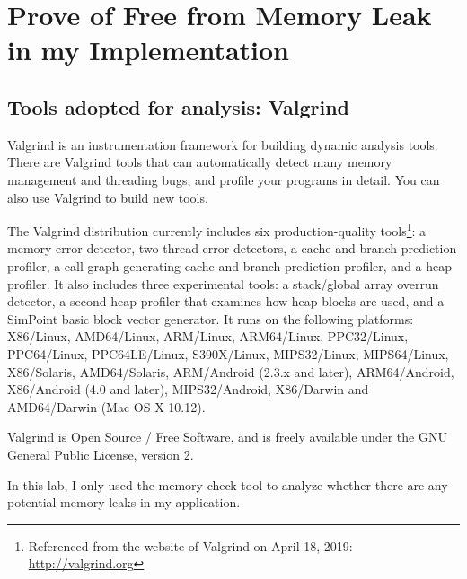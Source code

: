 \documentclass[a4paper]{report}
\begin{document}
\section{Prove of Free from Memory Leak in my Implementation}
\subsection{Tools adopted for analysis: Valgrind}
Valgrind is an instrumentation framework for building dynamic analysis tools. There are Valgrind tools that can automatically detect many memory management and threading bugs, and profile your programs in detail. You can also use Valgrind to build new tools. 
\par
The Valgrind distribution currently includes six production-quality tools\footnote{Referenced from the website of Valgrind on April 18, 2019: \url{http://valgrind.org}}: a memory error detector, two thread error detectors, a cache and branch-prediction profiler, a call-graph generating cache and branch-prediction profiler, and a heap profiler. It also includes three experimental tools: a stack/global array overrun detector, a second heap profiler that examines how heap blocks are used, and a SimPoint basic block vector generator. It runs on the following platforms: X86/Linux, AMD64/Linux, ARM/Linux, ARM64/Linux, PPC32/Linux, PPC64/Linux, PPC64LE/Linux, S390X/Linux, MIPS32/Linux, MIPS64/Linux, X86/Solaris, AMD64/Solaris, ARM/Android (2.3.x and later), ARM64/Android, X86/Android (4.0 and later), MIPS32/Android, X86/Darwin and AMD64/Darwin (Mac OS X 10.12).
\par
Valgrind is Open Source / Free Software, and is freely available under the GNU General Public License, version 2.
\par
In this lab, I only used the memory check tool to analyze whether there are any potential memory leaks in my application.
\end{document}
